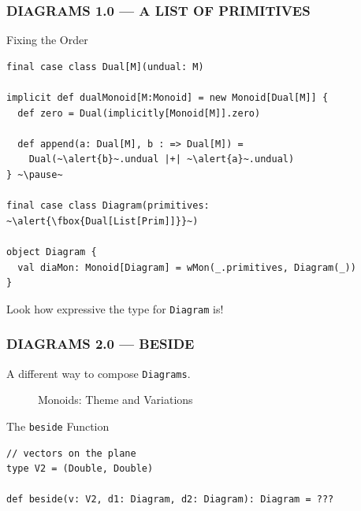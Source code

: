 \documentclass{beamer}
\begin{document}
\begin{frame}[fragile] \frametitle{DIAGRAMS 1.0 --- A LIST OF PRIMITIVES}
  \begin{block}{Fixing the Order}
    \vspace{-0.2cm}
  \begin{lstlisting}
final case class Dual[M](undual: M)

implicit def dualMonoid[M:Monoid] = new Monoid[Dual[M]] {
  def zero = Dual(implicitly[Monoid[M]].zero)

  def append(a: Dual[M], b : => Dual[M]) =
    Dual(~\alert{b}~.undual |+| ~\alert{a}~.undual)
} ~\pause~

final case class Diagram(primitives: ~\alert{\fbox{Dual[List[Prim]]}}~)

object Diagram {
  val diaMon: Monoid[Diagram] = wMon(_.primitives, Diagram(_))
}
  \end{lstlisting}
    \vspace{-0.5cm}
  \end{block}

Look how expressive the type for \texttt{Diagram} is!
\end{frame}

\begin{frame}[fragile] \frametitle{DIAGRAMS 2.0 --- BESIDE}
A different way to compose \texttt{Diagrams}.

  \begin{figure}
      \centering
      \caption{Monoids: Theme and Variations}
  \end{figure}

\vspace{-0.5cm}

  \begin{block}{The \texttt{beside} Function}
    \vspace{-0.2cm}
  \begin{lstlisting}
// vectors on the plane
type V2 = (Double, Double)

def beside(v: V2, d1: Diagram, d2: Diagram): Diagram = ???
  \end{lstlisting}
\vspace{-0.5cm}
  \end{block}
\end{frame}
\end{document}
